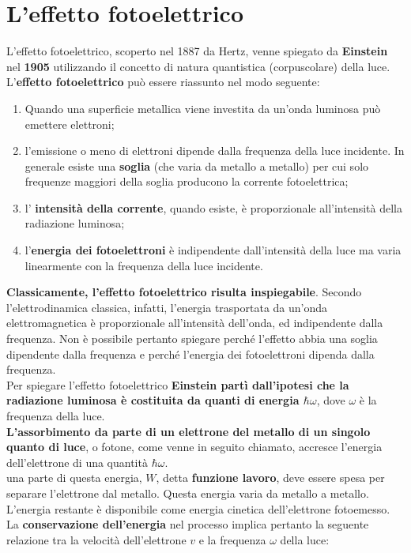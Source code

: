 \section{L'effetto fotoelettrico}
L'effetto fotoelettrico, scoperto nel 1887 da Hertz, venne spiegato da \textbf{Einstein} nel \textbf{1905} utilizzando il concetto di natura quantistica (corpuscolare) della luce.\\
L'\textbf{effetto fotoelettrico} può essere riassunto nel modo seguente:
\begin{enumerate}
\item Quando una superficie metallica viene investita da un'onda luminosa può emettere elettroni;
\item  l'emissione o meno di elettroni dipende dalla frequenza della luce incidente. In generale esiste una \textbf{soglia} (che varia da metallo a metallo) per cui solo frequenze maggiori della soglia producono la corrente fotoelettrica;
\item l' \textbf{intensità della corrente}, quando esiste, è proporzionale all'intensità della radiazione luminosa;
\item l'\textbf{energia dei fotoelettroni} è indipendente dall'intensità della luce ma varia linearmente con la frequenza della luce incidente.
\end{enumerate} 
\textbf{Classicamente, l'effetto fotoelettrico risulta inspiegabile}. Secondo l'elettrodinamica classica, infatti, l'energia trasportata da un'onda elettromagnetica è proporzionale all'intensità dell'onda, ed indipendente dalla frequenza. Non è possibile pertanto spiegare perché l'effetto abbia una soglia dipendente dalla frequenza e perché l'energia dei fotoelettroni dipenda dalla frequenza.\\
Per spiegare l'effetto fotoelettrico \textbf{Einstein partì dall'ipotesi che la radiazione luminosa è costituita da quanti di energia $\hbar \omega$}, dove $\omega$ è la frequenza della luce.\\
\textbf{L'assorbimento da parte di un elettrone del metallo di un singolo quanto di luce}, o fotone, come venne in seguito chiamato, accresce l'energia dell'elettrone di una quantità $\hbar \omega$.\\
una parte di questa energia, $W$, detta \textbf{funzione lavoro}, deve essere spesa per separare l'elettrone dal metallo. Questa energia varia da metallo a metallo. L'energia restante è disponibile come energia cinetica dell'elettrone fotoemesso. La \textbf{conservazione dell'energia} nel processo implica pertanto la seguente relazione tra la velocità dell'elettrone $v$ e la frequenza $\omega$ della luce:
